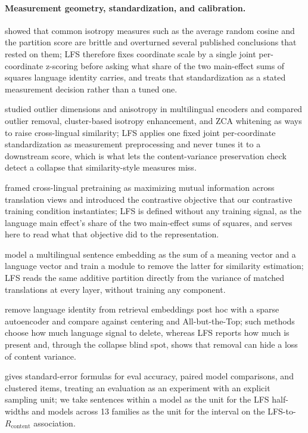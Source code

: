 \documentclass{article} %
\begin{document}
\paragraph{Measurement geometry, standardization, and calibration.}
\citet{rudman2022isoscore} showed that common isotropy measures such as the average random cosine and the partition score are brittle and overturned several published conclusions that rested on them; LFS therefore fixes coordinate scale by a single joint per-coordinate z-scoring before asking what share of the two main-effect sums of squares language identity carries, and treats that standardization as a stated measurement decision rather than a tuned one.

\citet{hammerl2023anisotropy} studied outlier dimensions and anisotropy in multilingual encoders and compared outlier removal, cluster-based isotropy enhancement, and ZCA whitening as ways to raise cross-lingual similarity; LFS applies one fixed joint per-coordinate standardization as measurement preprocessing and never tunes it to a downstream score, which is what lets the content-variance preservation check detect a collapse that similarity-style measures miss.

\citet{chi2021infoxlm} framed cross-lingual pretraining as maximizing mutual information across translation views and introduced the contrastive objective that our contrastive training condition instantiates; LFS is defined without any training signal, as the language main effect's share of the two main-effect sums of squares, and serves here to read what that objective did to the representation.

\citet{tiyajamorn2021representation} model a multilingual sentence embedding as the sum of a meaning vector and a language vector and train a module to remove the latter for similarity estimation; LFS reads the same additive partition directly from the variance of matched translations at every layer, without training any component.

\citet{kim2026langsae} remove language identity from retrieval embeddings post hoc with a sparse autoencoder and compare against centering and All-but-the-Top; such methods choose how much language signal to delete, whereas LFS reports how much is present and, through the collapse blind spot, shows that removal can hide a loss of content variance.

\citet{miller2024evals} gives standard-error formulas for eval accuracy, paired model comparisons, and clustered items, treating an evaluation as an experiment with an explicit sampling unit; we take sentences within a model as the unit for the LFS half-widths and models across 13 families as the unit for the interval on the LFS-to-$R_{\mathrm{content}}$ association.
\end{document}
